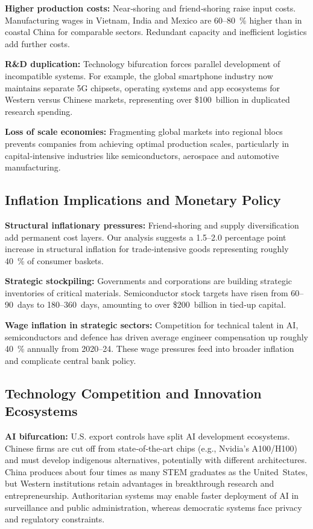 \documentclass{article}
\begin{document}
\textbf{Higher production costs:}  Near‑shoring and friend‑shoring raise input costs.  Manufacturing wages in Vietnam, India and Mexico are 60–80 \% higher than in coastal China for comparable sectors.  Redundant capacity and inefficient logistics add further costs.

\textbf{R\&D duplication:}  Technology bifurcation forces parallel development of incompatible systems.  For example, the global smartphone industry now maintains separate 5G chipsets, operating systems and app ecosystems for Western versus Chinese markets, representing over \$100 billion in duplicated research spending.

\textbf{Loss of scale economies:}  Fragmenting global markets into regional blocs prevents companies from achieving optimal production scales, particularly in capital‑intensive industries like semiconductors, aerospace and automotive manufacturing.

\subsection{Inflation Implications and Monetary Policy}

\textbf{Structural inflationary pressures:}  Friend‑shoring and supply diversification add permanent cost layers.  Our analysis suggests a 1.5–2.0 percentage point increase in structural inflation for trade‑intensive goods representing roughly 40 \% of consumer baskets.

\textbf{Strategic stockpiling:}  Governments and corporations are building strategic inventories of critical materials.  Semiconductor stock targets have risen from 60–90 days to 180–360 days, amounting to over \$200 billion in tied‑up capital.

\textbf{Wage inflation in strategic sectors:}  Competition for technical talent in AI, semiconductors and defence has driven average engineer compensation up roughly 40 \% annually from 2020–24.  These wage pressures feed into broader inflation and complicate central bank policy.

\subsection{Technology Competition and Innovation Ecosystems}

\textbf{AI bifurcation:}  U.S. export controls have split AI development ecosystems.  Chinese firms are cut off from state‑of‑the‑art chips (e.g., Nvidia’s A100/H100) and must develop indigenous alternatives, potentially with different architectures.  China produces about four times as many STEM graduates as the United States, but Western institutions retain advantages in breakthrough research and entrepreneurship.  Authoritarian systems may enable faster deployment of AI in surveillance and public administration, whereas democratic systems face privacy and regulatory constraints.
\end{document}
